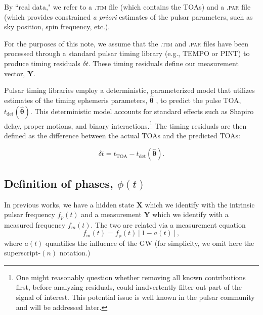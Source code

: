 \documentclass{tufte-handout} %
\begin{document}
\noindent By ``real data," we refer to a \textsc{.tim} file (which contains the TOAs) and a \textsc{.par} file (which provides constrained \textit{a priori} estimates of the pulsar parameters, such as sky position, spin frequency, etc.). \newline

For the purposes of this note, we assume that the \textsc{.tim} and \textsc{.par} files have been processed through a standard pulsar timing library (e.g., TEMPO or PINT) to produce timing residuals $\delta t$. These timing residuals define our measurement vector, $\boldsymbol{Y}$. \newline 

Pulsar timing libraries employ a deterministic, parameterized model that utilizes estimates of the timing ephemeris parameters, $\boldsymbol{\hat{\theta}}$ , to predict the pulse TOA, $t_{\text{det}}(\boldsymbol{\hat{\theta}})$. This deterministic model accounts for standard effects such as Shapiro delay, proper motions, and binary interactions.\footnote{One might reasonably question whether removing all known contributions first, before analyzing residuals, could inadvertently filter out part of the signal of interest. This potential issue is well known in the pulsar community and will be addressed later.} The timing residuals are then defined as the difference between the actual TOAs and the predicted TOAs:

\begin{equation}
	\delta t = t_{\text{TOA}} - t_{\text{det}}(\boldsymbol{\hat{\theta}}). \label{eq:delta_t_og_defn}
\end{equation}


\subsection{Definition of phases, $\phi(t)$}

In previous works, we have a hidden state $\boldsymbol{X}$ which we identify with the intrinsic pulsar frequency $f_p(t)$ and a measurement  $\boldsymbol{Y}$ which we identify with a measured frequency $f_m(t)$. The two are related via a measurement equation 
\begin{equation}
	f_{\text{m}}(t) = f_{\text{p}}(t) \left[1 - a(t)\right], \label{eq:measurement}
\end{equation}
where $a(t)$ quantifies the influence of the GW (for simplicity, we omit here the superscript-$(n)$ notation.) \newline 
\end{document}
